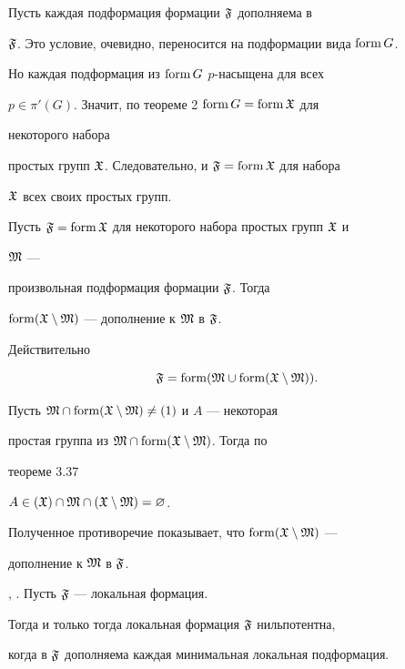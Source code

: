 \begin{pf} Пусть каждая подформация формации $\frak F$ дополняема в 


$\frak F$. Это условие, очевидно, переносится на подформации вида $\operatorname{form} G$. 


Но каждая подформация из $\operatorname{form} G$ $p$-насыщена для всех 


$p\in\pi'(G)$. Значит, по теореме 2 $\operatorname{form} G=\operatorname{form}\frak X$ для 


некоторого набора 


простых групп $\frak X$. Следовательно, и $\frak F=\operatorname{form}\frak X$ для набора 


$\frak X$ всех своих простых групп. 


 


Пусть $\frak F=\operatorname{form}\frak X$ для некоторого набора простых групп $\frak X$ и 


$\frak M$ --- 


произвольная подформация формации $\frak F$. Тогда 


$\operatorname{form}(\frak X\setminus\frak M)$ --- дополнение к $\frak M$ в $\frak F$. 


Действительно 


$$ 


\frak F=\form(\frak M\cup\form(\frak X\setminus\frak M)). 


$$ 


Пусть $\frak M\cap\operatorname{form}(\frak X\setminus\frak M)\ne(1)$ и $A$ --- некоторая 


простая группа из $\frak M\cap\operatorname{form}(\frak X\setminus\frak M)$. Тогда по 


теореме 3.37 \cite{She3} 


$A\in(\frak X)\cap\frak M\cap(\frak X\setminus\frak M)=\varnothing$. 


Полученное противоречие показывает, что $\operatorname{form}(\frak X\setminus\frak M)$ --- 


дополнение к $\frak M$ в $\frak F$.


\end{pf} 


 


\begin{cor} \cite{Ved}, \cite{Ski3}. Пусть $\frak F$ --- локальная формация.


Тогда и только тогда локальная формация $\frak F$ нильпотентна,


когда в $\frak F$ дополняема каждая минимальная локальная подформация. 


\end{cor} 


